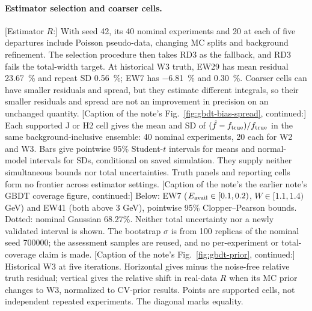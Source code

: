 \paragraph{Estimator selection and coarser cells.} [Estimator $R$:] With seed 42, its 40 nominal experiments and 20 at each of five departures include Poisson pseudo-data, changing MC splits and background refinement. The selection procedure then takes RD3 as the fallback, and RD3 fails the total-width target. At historical W3 truth, EW29 has mean residual \SI{23.67}{\percent} and repeat SD \SI{0.56}{\percent}; EW7 has \SI{-6.81}{\percent} and \SI{0.30}{\percent}. Coarser cells can have smaller residuals and spread, but they estimate different integrals, so their smaller residuals and spread are not an improvement in precision on an unchanged quantity. [Caption of the note's Fig.~\ref{fig:gbdt-bias-spread}, continued:] Each supported J or H2 cell gives the mean and SD of $(\hat f-f_{\rm true})/f_{\rm true}$ in the same background-inclusive ensemble: 40 nominal experiments, 20 each for W2 and W3. Bars give pointwise 95\% Student-$t$ intervals for means and normal-model intervals for SDs, conditional on saved simulation. They supply neither simultaneous bounds nor total uncertainties. Truth panels and reporting cells form no frontier across estimator settings. [Caption of the note's the earlier note's GBDT coverage figure, continued:] Below: EW7 ($E_{\mathrm{avail}}\in[0.1,0.2)$, $W\in[1.1,1.4)$ GeV) and EW41 (both above 3 GeV), pointwise 95\% Clopper--Pearson bounds. Dotted: nominal Gaussian 68.27\%. Neither total uncertainty nor a newly validated interval is shown. The bootstrap $\sigma$ is from 100 replicas of the nominal seed 700000; the assessment samples are reused, and no per-experiment or total-coverage claim is made. [Caption of the note's Fig.~\ref{fig:gbdt-prior}, continued:] Historical W3 at five iterations. Horizontal gives minus the noise-free relative truth residual; vertical gives the relative shift in real-data $R$ when its MC prior changes to W3, normalized to CV-prior results. Points are supported cells, not independent repeated experiments. The diagonal marks equality.

